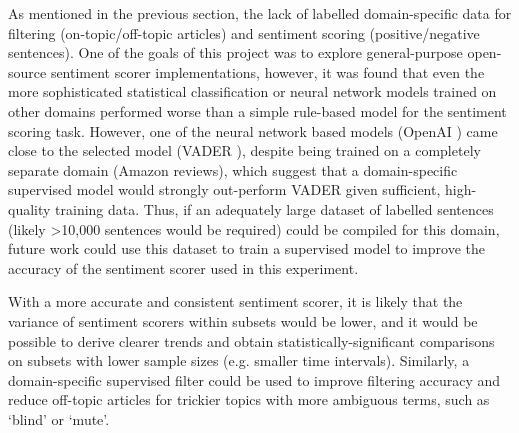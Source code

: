 \documentclass{report}
\begin{document}
As mentioned in the previous section, the lack of labelled domain-specific data for filtering (on-topic/off-topic articles) and sentiment scoring (positive/negative sentences).
One of the goals of this project was to explore general-purpose open-source sentiment scorer implementations, however, it was found that even the more sophisticated statistical classification or neural network models trained on other domains performed worse than a simple rule-based model for the sentiment scoring task.
However, one of the neural network based models (OpenAI \cite{OpenAI}) came close to the selected model (VADER \cite{VADER}), despite being trained on a completely separate domain (Amazon reviews), which suggest that a domain-specific supervised model would strongly out-perform VADER given sufficient, high-quality training data.
Thus, if an adequately large dataset of labelled sentences (likely \textgreater10,000 sentences would be required) could be compiled for this domain, future work could use this dataset to train a supervised model to improve the accuracy of the sentiment scorer used in this experiment.

With a more accurate and consistent sentiment scorer, it is likely that the variance of sentiment scorers within subsets would be lower, and it would be possible to derive clearer trends and obtain statistically-significant comparisons on subsets with lower sample sizes (e.g. smaller time intervals).
Similarly, a domain-specific supervised filter could be used to improve filtering accuracy and reduce off-topic articles for trickier topics with more ambiguous terms, such as `blind' or `mute'.
\end{document}
